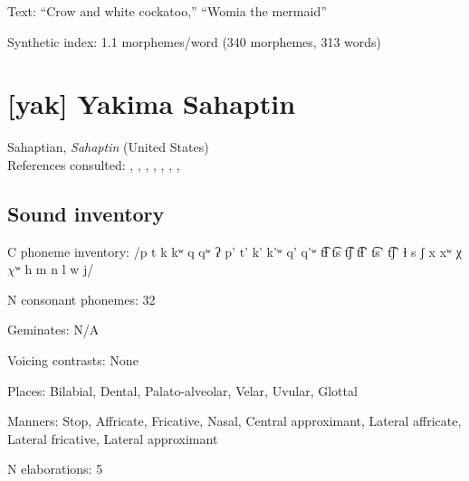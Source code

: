 {\begin{appendixdesc}

\item[Text:] “Crow and white cockatoo,” “Womia the mermaid” \citep[378--382]{Marmion2010}

\item[Synthetic index:] 1.1 morphemes/word (340 morphemes, 313 words)
\end{appendixdesc}
\section*{[yak] Yakima Sahaptin}  %
Sahaptian, \textit{Sahaptin} (United States)\medskip\\
References consulted: \citet{HargusBeavert2002}, \citet{HargusBeavert2005}, \citet{HargusBeavert2006}, \citet{Jansen2010}, \citet{Minthorn2005}, \citet{RigsbyRude1996}, \citet{Rude2009}, \citet{RudeReservation2014}

\subsection*{Sound inventory}
\begin{appendixdesc}

\item[C phoneme inventory:] /p t k kʷ q qʷ ʔ p’ t’ k’ k’ʷ q’ q’ʷ t͡ɬ t͡s t͡ʃ t͡ɬ’ t͡s’ t͡ʃ’ ɬ s ʃ x xʷ χ $\chi ʷ$ h m n l w j/

\item[N consonant phonemes:] 32

\item[Geminates:] N/A

\item[Voicing contrasts:] None

\item[Places:] Bilabial, Dental, Palato-alveolar, Velar, Uvular, Glottal

\item[Manners:] Stop, Affricate, Fricative, Nasal, Central approximant, Lateral affricate, Lateral fricative, Lateral approximant

\item[N elaborations:] 5


\end{appendixdesc}}
